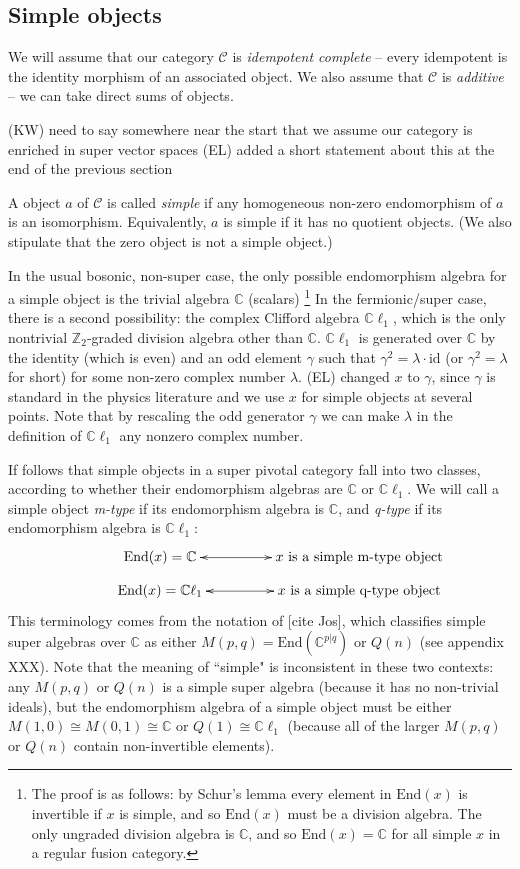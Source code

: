 \documentclass[12pt,a4paper]{article}
\newcommand{\cc}{\mathbb{C}}
\newcommand{\zt}{\mathbb{Z}_2}
\newcommand{\mcc}{\mathcal{C}}
\newcommand{\id}{\text{id}}
\newcommand{\End}{\text{End}}
\newcommand{\cl}{\mathbb{C}\ell}
\newcommand{\ethan}[1]{{\color{amethyst}\footnotesize{(EL) #1}}}
\newcommand{\kw}[1]{{\color{kwcolor}\footnotesize{(KW) #1}}}
\begin{document}
\subsection{Simple objects}

We will assume that our category $\mcc$ is {\it idempotent complete} -- 
every idempotent is the identity morphism of an associated object.
We also assume that $\mcc$ is {\it additive} -- we can take direct sums of objects.

\kw{need to say somewhere near the start that we assume our category is enriched in super vector spaces} \ethan{added a short statement about this at the end of the previous section}

A object $a$ of $\mcc$ is called {\it simple} if any homogeneous non-zero endomorphism of $a$ is an isomorphism.
Equivalently, $a$ is simple if it has no quotient objects.
(We also stipulate that the zero object is not a simple object.)

In the usual bosonic, non-super case, the only possible endomorphism algebra for a simple object
is the trivial algebra $\cc$ (scalars)
\footnote{The proof is as follows: by Schur's lemma every element in $\End(x)$ is invertible if $x$ is simple, and so $\End(x)$ must be a division algebra. 
The only ungraded division algebra is $\cc$, and so $\End(x) = \cc$ for all simple $x$ in a regular fusion category.}
In the fermionic/super case, there is a second possibility: the complex Clifford algebra $\cl_1$, which is the only nontrivial $\zt$-graded division algebra other than $\cc$.
$\cl_1$ is generated over $\cc$ by the identity (which is even) and an odd element $\gamma$ such that $\gamma^2 = \lambda \cdot \id$
(or $\gamma^2 = \lambda$ for short) for some non-zero complex number $\lambda$. \ethan{changed $x$ to $\gamma$, since $\gamma$ is standard in the physics literature and we use $x$ for simple objects at several points.}
Note that by rescaling the odd generator $\gamma$ we can make $\lambda$ in the definition of $\cl_1$ any nonzero complex number. 

If follows that simple objects in a super pivotal category fall into two classes, according to whether their endomorphism algebras are $\cc$ or $\cl_1$. 
We will call a simple object {\it m-type} if its endomorphism algebra
is $\cc$, and {\it q-type} if its endomorphism algebra is $\cl_1$:
\begin{align}
\vcenter{\xymatrix @!0 @M=1mm @C=25mm{
& \text{End}(x) = \mathbb{C} \ar@{<->}[rr] &   &\text{$x$ is a simple m-type object}&  \\
&\text{End}(x) = \mathbb{C} \ell_1 \ar@{<->}[rr]  &  &\text{$x$ is a simple q-type object}&
	}}
\end{align}
This terminology comes from the notation of [cite Jos], which classifies simple super algebras over $\cc$ as either
$M(p,q) = \End(\cc^{p|q})$ or $Q(n)$ (see appendix XXX).
Note that the meaning of ``simple" is inconsistent in these two contexts: any $M(p,q)$ or $Q(n)$ is a simple super algebra
(because it has no non-trivial ideals), but the endomorphism algebra of a simple object must be either
$M(1,0) \cong M(0,1) \cong \cc$ or $Q(1) \cong \cl_1$ 
(because all of the larger $M(p,q)$ or $Q(n)$ contain non-invertible elements).
\end{document}

